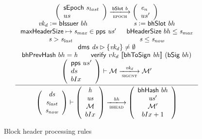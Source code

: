 \documentclass[11pt,a4paper]{article}
\newcommand{\restrictrange}{\rhd}
\newcommand{\var}[1]{\mathit{#1}}
\newcommand{\fun}[1]{\mathsf{#1}}
\newcommand{\trans}[2]{\xlongrightarrow[\textsc{#1}]{#2}}
\newcommand{\serialised}[1]{\llbracket \var{#1} \rrbracket}
\newcommand{\leteq}{\ensuremath{\mathrel{\mathop:}=}}
\newcommand{\bhdrsizename}{bHeaderSize}
\newcommand{\verifyname}{verify}
\newcommand{\signmapname}{\mathcal{M}}
\newcommand{\bsigname}{bSig}
\newcommand{\bissuername}{bIssuer}
\newcommand{\verify}[3]{\fun{\verifyname} ~ #1 ~ #2 ~ #3}
\newcommand{\bhdrsize}[1]{\fun{\bhdrsizename} ~ #1}
\newcommand{\bsig}[1]{\fun{\bsigname} ~ #1}
\newcommand{\bissuer}[1]{\fun{\bissuername} ~ #1}
\begin{document}
\begin{figure}[ht]
  \begin{equation*}
    \inference
    { {\left(
          \begin{array}{l}
            \sepoch{s_{last}} \\
            us
          \end{array}
        \right)}
      \trans{epoch}{\bslot{b}}
      {\left(
          \begin{array}{l}
            \var{e_n} \\
            us'
          \end{array}
        \right)}
      \\
      \var{vk_d} \leteq \bissuer{bh} & \var{s} \leteq \bhslot{bh}
      \\ \maxheadersize \mapsto \var{s_{max}} \in \fun{pps}~\var{us'} & \bhdrsize{bh} \leq \var{s_{max}}
      \\ \var{s} > \var{s_{last}} & \var{s} \leq \var{s_{now}}
      \\ \fun{dms} ~  \var{ds} \restrictrange \{\var{vk_d}\} \neq \emptyset
      \\ \bhprevhash{bh} = \var{h} & \verify{vk_d}{\serialised{\bhtosign{bh}}}{(\bsig{bh})}
      \\
      {\left(
          \begin{array}{l}
            \fun{pps} ~  us' \\
            ds \\
            bIx
          \end{array}
        \right)}
      \vdash
      \signmapname \trans{sigcnt}{\var{vk_d}} \signmapname'
      \\
    }
    {
      \left(
        {\begin{array}{c}
           \var{ds} \\
           \var{s_{last}} \\
           \var{s_{now}} \\
         \end{array}}
     \right)
     \vdash
     \left(
       {\begin{array}{c}
          \var{h} \\
          \var{us} \\
          \signmapname \\
          bIx \\
        \end{array}}
    \right)
    \trans{bhead}{\var{bh}}
    \left(
      {\begin{array}{c}
         \bhhash{bh} \\
         \var{us'} \\
         \signmapname' \\
         bIx + 1 \\
       \end{array}}
   \right)
 }
\end{equation*}
\caption{Block header processing rules}
\label{fig:rules:bhead}
\end{figure}
\end{document}
